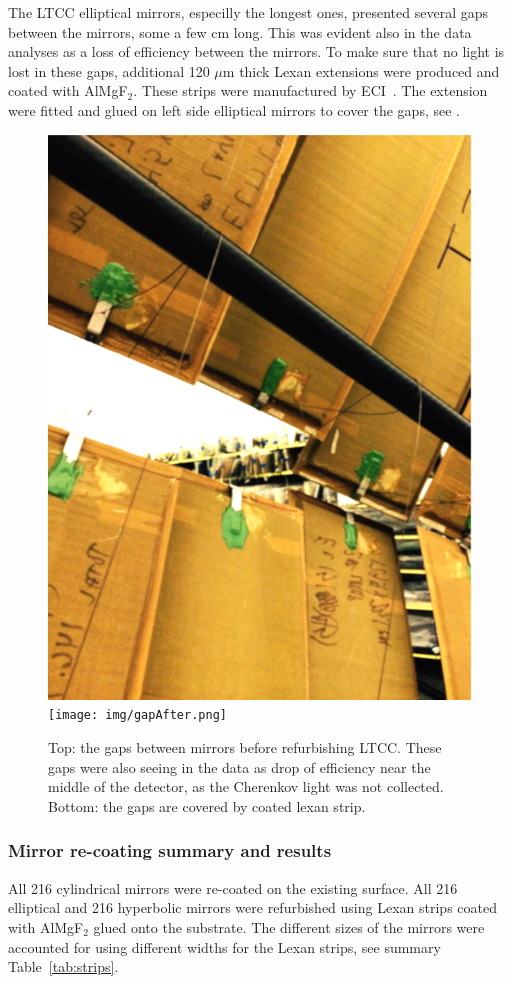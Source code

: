 The LTCC elliptical mirrors, especilly the longest ones, presented several gaps between the mirrors, some a few cm long.
This was evident also in the data analyses as a loss of efficiency between the mirrors.
To make sure that no light is lost in these gaps, additional 120 $\mu$m thick Lexan extensions were produced and coated with AlMgF$_2$.
These strips were manufactured by ECI~\cite{ECI}. The extension were fitted and glued on left side elliptical mirrors to cover the gaps,
see .

\begin{figure}
\centering
	\includegraphics[width=0.98\columnwidth, height=0.7\columnwidth]{img/gapBefore.png}
	\texttt{[image: img/gapAfter.png]}
	\caption{Top: the gaps between mirrors before refurbishing LTCC. These gaps were also seeing in the data as
			 drop of efficiency near the middle of the detector, as the Cherenkov light was not collected.
             Bottom: the gaps are covered by coated lexan strip.}
	\label{fig:gapBeforeAndAfter}
\end{figure}


\subsubsection{Mirror re-coating summary and results}

All 216 cylindrical mirrors were re-coated on the existing surface. All 216 elliptical and 216 hyperbolic mirrors were refurbished using Lexan strips
coated with AlMgF$_2$ glued onto the substrate. The different sizes of the mirrors were accounted for using different widths for the Lexan strips, see
summary Table~\ref{tab:strips}.


